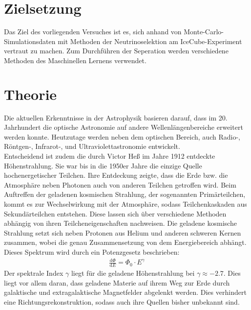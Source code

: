 \section{Zielsetzung}
Das Ziel des vorliegenden Versuches ist es, sich anhand von Monte-Carlo-Simulationsdaten mit Methoden der Neutrinoselektion am IceCube-Experiment vertraut zu machen. Zum Durchführen der Seperation werden verschiedene Methoden des Maschinellen Lernens verwendet.
\section{Theorie}
\label{kap:Theorie}
Die aktuellen Erkenntnisse in der Astrophysik basieren darauf, dass im 20. Jahrhundert die optische Astronomie auf andere Wellenlängenbereiche erweitert werden konnte. Heutzutage werden neben dem optischen Bereich, auch Radio-, Röntgen-, Infrarot-, und Ultraviolettastronomie entwickelt.\\
Entscheidend ist zudem die durch Victor Heß im Jahre 1912 entdeckte Höhenstrahlung. Sie war bis in die 1950er Jahre die einzige Quelle hochenergetischer Teilchen. Ihre Entdeckung zeigte, dass die Erde bzw. die Atmosphäre neben Photonen auch von anderen Teilchen getroffen wird. Beim Auftreffen der geladenen kosmischen Strahlung, der sogenannten Primärteilchen, kommt es zur Wechselwirkung mit der Atmosphäre, sodass Teilchenkaskaden aus Sekundärteilchen entstehen. Diese lassen sich über verschiedene Methoden abhängig von ihren Teilcheneigenschaften nachweisen. Die geladene kosmische Strahlung setzt sich neben Protonen aus Helium und anderen schweren Kernen zusammen, wobei die genau Zusammensetzung von dem Energiebereich abhängt. Dieses Spektrum wird durch ein Potenzgesetz beschrieben:
\begin{align}
	\frac{\text{d}\Phi}{\text{d}E} = \Phi_{0} \cdot E^{\gamma}
\end{align}
Der spektrale Index $\gamma$ liegt für die geladene Höhenstrahlung bei $\gamma \approx -2.7$. Dies liegt vor allem daran, dass geladene Materie auf ihrem Weg zur Erde durch galaktische und extragalaktische Magnetfelder abgelenkt werden. Dies verhindert eine Richtungsrekonstruktion, sodass auch ihre Quellen bisher unbekannt sind.
